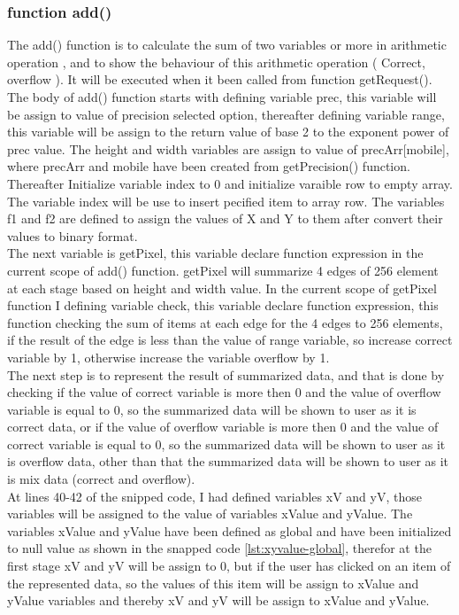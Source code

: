 \documentclass[11pt]{article}
\begin{document}
\subsubsection{function add()}
The add() function is to calculate the sum of two variables or more in arithmetic operation , and to show the behaviour of this arithmetic operation ( Correct, overflow ).  It will be executed when it been called from function getRequest().\\
The body of add() function starts with defining variable prec, this variable will be assign to value of precision selected option, thereafter defining variable  range, this variable will be assign to the return value of base 2 to the exponent power of prec value.
The height and width variables are assign to value of precArr[mobile], where precArr and mobile have been created from getPrecision() function.
Thereafter Initialize variable index to 0 and initialize varaible row to empty array. The variable index will be use to insert pecified item to array row. The variables f1 and f2 are defined to assign the values of X and Y to them after convert their values to binary format.\\

The next variable is getPixel, this variable declare function expression in the current scope of add() function. getPixel will summarize 4 edges of 256 element at each stage based on height and width value. In the current scope of getPixel function I defining variable check, this variable declare function expression, this function checking the sum of items at each edge for the 4 edges to 256 elements, if the result of the edge is less than the value of range variable, so increase correct variable by 1,  otherwise increase the variable overflow by 1.\\

The next step is to represent the result of summarized data, and that is done by checking if the value of correct variable is more then 0 and the value of overflow variable is equal to 0, so the summarized data will be shown to user as it is correct data, or if the value of overflow variable is more then 0 and the value of correct variable is equal to 0, so the summarized data will be shown to user as it is overflow data, other than that the summarized data will be shown to user as it is mix data (correct and overflow).\\

At lines 40-42 of the snipped code, I had defined variables xV and yV, those variables will be assigned to the value of variables xValue and yValue. The variables xValue and yValue have been defined as global and have been initialized to null value as shown in the snapped code \ref{lst:xyvalue-global}, therefor at the first stage xV and yV will be assign to 0,  but if the user has clicked on an item of the represented data, so the values of this item will be assign to xValue and yValue variables and thereby xV and yV will be assign to xValue and yValue.\\
\end{document}
